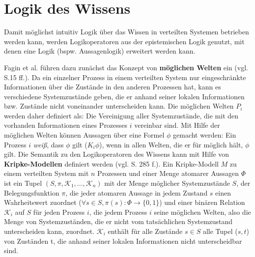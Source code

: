 \section{Logik des Wissens}
\label{Logik}
Damit möglichst intuitiv Logik über das Wissen in verteilten Systemen betrieben werden kann, werden Logikoperatoren aus der epistemischen Logik genutzt, mit denen eine Logik (bspw. Aussagenlogik) erweitert werden kann.

Fagin et al. führen dazu zunächst das Konzept von \textbf{möglichen Welten} ein (vgl. \cite{fagin2003reasoning} S.15 ff.). 
Da ein einzelner Prozess in einem verteilten System nur eingeschränkte Informationen über die Zustände in den anderen Prozessen hat, kann es verschiedene Systemzustände geben, die er anhand seiner lokalen Informationen bzw. Zustände nicht voneinander unterscheiden kann. Die möglichen Welten $P_i$ werden daher definiert als: Die Vereinigung aller Systemzustände, die mit den vorhanden Informationen eines Prozesses $i$ vereinbar sind.
Mit Hilfe der möglichen Welten können Aussagen über eine Formel $\phi$ gemacht werden:
Ein Prozess $i$ \textit{weiß}, dass $\phi$ gilt ($K_i\phi$), wenn in allen Welten, die er für möglich hält, $\phi$ gilt.
Die Semantik zu den Logikoperatoren des Wissens kann mit Hilfe von \textbf{Kripke-Modellen} definiert werden (vgl. \cite{kshemkalyani2011distributed} S. 285 f.).
Ein Kripke-Modell $M$ zu einem verteilten System mit $n$ Prozessen und einer Menge atomarer Aussagen $\Phi$ ist ein Tupel $(S,\pi,\mathcal{K}_1,...,\mathcal{K}_n)$ mit der Menge möglicher Systemzustände $S$, der Belegungsfunktion $\pi$, die jeder atomaren Aussage in jedem Zustand $s$ einen Wahrheitswert zuordnet ($\forall s\in S, \pi(s):\Phi \rightarrow \{0,1\}$) und einer binären Relation $\mathcal{K}_i$ auf $S$ für jeden Prozess $i$, die jedem Prozess $i$ seine möglichen Welten, also die Menge von Systemzuständen, die er nicht vom tatsächlichen Systemzustand unterscheiden kann, zuordnet. $\mathcal{K}_i$ enthält für alle Zustände $s \in S$ alle Tupel ($s,t$) von Zuständen t, die anhand seiner lokalen Informationen nicht unterscheidbar sind. \medskip


